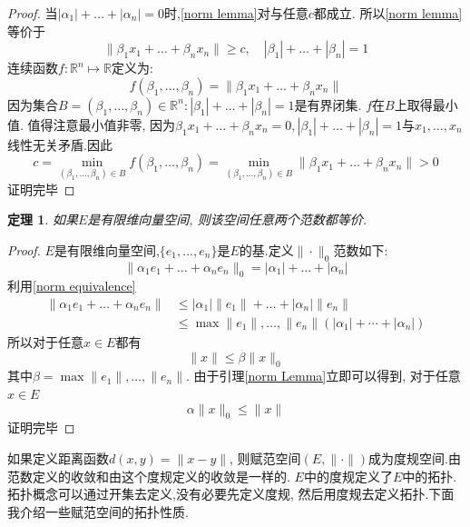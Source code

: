 \documentclass[a4paper,11pt]{book}
\newtheorem{theorem}{\hspace{2em}定理}[section]
\newtheorem{proof}{证明}[section]
\begin{document}
\begin{proof}
  当$|\alpha_1|+\dots+|\alpha_n|=0$时,\eqref{norm lemma}对与任意$c$都成立. 所以\eqref{norm lemma}等价于
  \begin{equation*}
    \|\beta_1x_1+\dots+\beta_nx_n\|\geq c,\quad|\beta_1|+\dots+|\beta_n|=1
  \end{equation*}
  连续函数$f:\mathbb{R}^n\mapsto\mathbb{R}$定义为:
  \begin{equation*}
    f(\beta_1,\dots,\beta_n)=\|\beta_1x_1+\dots+\beta_nx_n\|
  \end{equation*}
  因为集合$B={(\beta_1,\dots,\beta_n)\in\mathbb{R}^n:|\beta_1|+\dots+|\beta_n|=1}$是有界闭集. $f$在$B$上取得最小值. 值得注意最小值非零, 因为$\beta_1x_1+\dots+\beta_nx_n=0,|\beta_1|+\dots+|\beta_n|=1$与$x_1,\dots,x_n$线性无关矛盾.因此
  \begin{equation*}
    c=\min_{(\beta_1,\dots,\beta_n)\in B}f(\beta_1,\dots,\beta_n)=\min_{(\beta_1,\dots,\beta_n)\in B}\|\beta_1x_1+\dots+\beta_nx_n\|>0
  \end{equation*}
  证明完毕
\end{proof}
\begin{theorem}
  如果$E$是有限维向量空间, 则该空间任意两个范数都等价.
\end{theorem}
\begin{proof}
  $E$是有限维向量空间,$\{e_1,\dots,e_n\}$是$E$的基.定义$\|\cdot\|_0$范数如下:
  \begin{equation*}
    \|\alpha_1e_1+\dots+\alpha_ne_n\|_0=|\alpha_1|+\dots+|\alpha_n|
  \end{equation*}
  利用\ref{norm equivalence}
  \begin{equation*}
  \begin{split}
     \|\alpha_1e_1+\dots+\alpha_ne_n\|&\leq|\alpha_1|\|e_1\|+\dots+|\alpha_n|\|e_n\| \\
       &\leq\max{\|e_1\|,\dots,\|e_n\|}(|\alpha_1|+\cdots+|\alpha_n|)
  \end{split}
  \end{equation*}
  所以对于任意$x\in E$都有
  \begin{equation*}
    \|x\|\leq\beta\|x\|_0
  \end{equation*}
  其中$\beta=\max{\|e_1\|,\dots,\|e_n\|}$. 由于引理\ref{norm Lemma}立即可以得到, 对于任意$x\in E$
  \begin{equation*}
    \alpha\|x\|_0\leq\|x\|
  \end{equation*}
  证明完毕
\end{proof}
如果定义距离函数$d(x,y)=\|x-y\|$, 则赋范空间$(E,\|\cdot\|)$成为度规空间.由范数定义的收敛和由这个度规定义的收敛是一样的. $E$中的度规定义了$E$中的拓扑. 拓扑概念可以通过开集去定义,没有必要先定义度规, 然后用度规去定义拓扑.下面我介绍一些赋范空间的拓扑性质.
\end{document}
